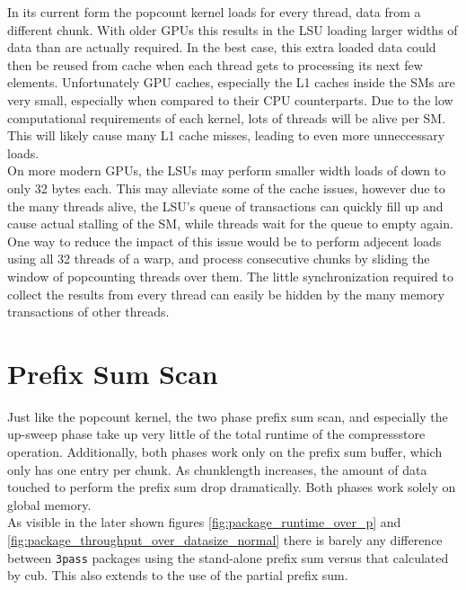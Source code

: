 \documentclass{tudscrreprt}
\begin{document}
			In its current form the popcount kernel loads for every thread, data from a different chunk. With older GPUs this results in the LSU loading larger widths of data than are actually required. In the best case, this extra loaded data could then be reused from cache when each thread gets to processing its next few elements. Unfortunately GPU caches, especially the L1 caches inside the SMs are very small, especially when compared to their CPU counterparts. Due to the low computational requirements of each kernel, lots of threads will be alive per SM. This will likely cause many L1 cache misses, leading to even more unneccessary loads. \\
			On more modern GPUs, the LSUs may perform smaller width loads of down to only 32 bytes each. This may alleviate some of the cache issues, however due to the many threads alive, the LSU's queue of transactions can quickly fill up and cause actual stalling of the SM, while threads wait for the queue to empty again. \\
			One way to reduce the impact of this issue would be to perform adjecent loads using all 32 threads of a warp, and process consecutive chunks by sliding the window of popcounting threads over them. The little synchronization required to collect the results from every thread can easily be hidden by the many memory transactions of other threads. \\
		
		\section{Prefix Sum Scan}
			Just like the popcount kernel, the two phase prefix sum scan, and especially the up-sweep phase take up very little of the total runtime of the compressstore operation. Additionally, both phases work only on the prefix sum buffer, which only has one entry per chunk. As chunklength increases, the amount of data touched to perform the prefix sum drop dramatically. Both phases work solely on global memory. \\
		
			As visible in the later shown figures \ref{fig:package_runtime_over_p} and \ref{fig:package_throughput_over_datasize_normal} there is barely any difference between \texttt{3pass} packages using the stand-alone prefix sum versus that calculated by cub. This also extends to the use of the partial prefix sum. \\
		
\end{document}
